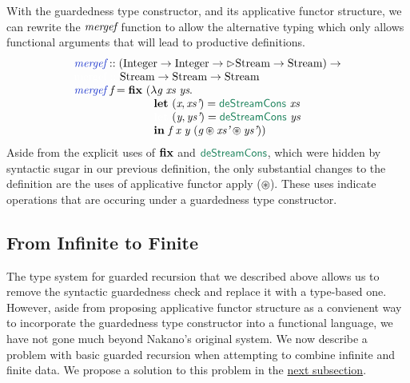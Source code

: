 With the guardedness type constructor, and its applicative functor
structure, we can rewrite the $\textit{mergef}$ function to allow the
alternative typing which only allows functional arguments that will
lead to productive definitions.
\begin{displaymath}
  \begin{array}{l}
    \defn{mergef} :: (\tyname{Integer} \to \tyname{Integer} \to \rhd\tyname{Stream} \to \tyname{Stream}) \to \\
    \textcolor{white}{\textrm{mergef} :: }\ \tyname{Stream} \to \tyname{Stream} \to \tyname{Stream} \\
    \defn{mergef}\ \ident{f} = \kw{fix}\ (\lambda \ident{g}\ \ident{xs}\ \ident{ys}. \\
    \hspace{2.5cm} \kw{let}\ (\ident{x}, \ident{xs'}) = \elim{deStreamCons}\ \ident{xs} \\
    \hspace{2.5cm} \textcolor{white}{\kw{let}\ }(\ident{y}, \ident{ys'}) = \elim{deStreamCons}\ \ident{ys} \\
    \hspace{2.5cm} \kw{in}\ \ident{f}\ \ident{x}\ \ident{y}\ (\ident{g} \circledast \ident{xs'} \circledast \ident{ys'}))
  \end{array}
\end{displaymath}
Aside from the explicit uses of $\textbf{fix}$ and $\elim{deStreamCons}$,
which were hidden by syntactic sugar in our previous definition, the
only substantial changes to the definition are the uses of applicative
functor apply ($\circledast$). These uses indicate operations that are
occuring under a guardedness type constructor.

\subsection{From Infinite to Finite}

The type system for guarded recursion that we described above allows
us to remove the syntactic guardedness check and replace it with a
type-based one. However, aside from proposing applicative functor
structure as a convienent way to incorporate the guardedness type
constructor into a functional language, we have not gone much beyond
Nakano's original system. We now describe a problem with basic guarded
recursion when attempting to combine infinite and finite data. We
propose a solution to this problem in the
\hyperref[sec:clock-vars]{next subsection}.

